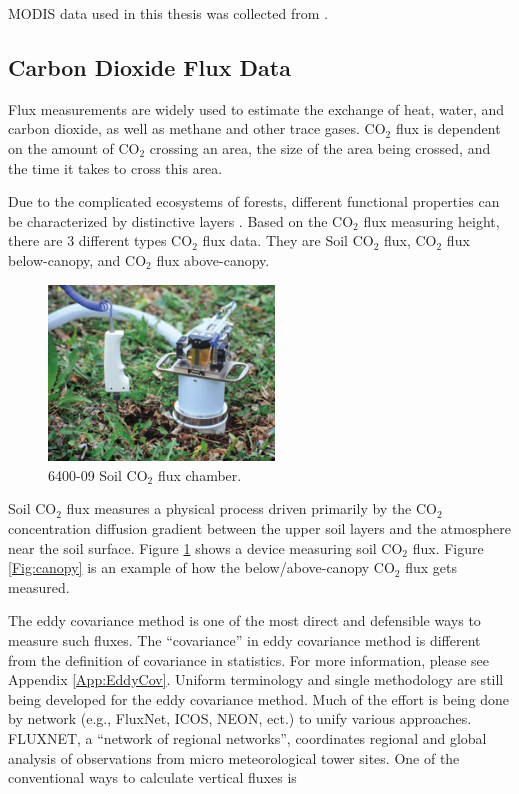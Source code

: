 \documentclass{article}\usepackage[]{graphicx}\usepackage[]{color}
\newcommand{\MYhref}[3][blue]{\href{#2}{\color{#1}{#3}}}%
\begin{document}
MODIS data used in this thesis was collected from \MYhref[black]{http://daac.ornl.gov/MODIS/}{the Oak Ridge National Laboratory Distributed Active Archive Center (ORNL DAAC) MODIS land product subsets}.

\subsection{Carbon Dioxide Flux Data}\label{SubSec:FluxData}

Flux measurements are widely used to estimate the exchange of heat, water, and carbon dioxide, as well as methane and other trace gases. CO$_2$ flux is dependent on the amount of CO$_2$ crossing an area, the size of the area being crossed, and the time it takes to cross this area.

Due to the complicated ecosystems of forests, different functional properties can be characterized by distinctive layers \citep{misson2007partitioning}.
Based on the CO$_2$ flux measuring height, there are 3 different types CO$_2$ flux data. They are Soil CO$_2$ flux, CO$_2$ flux below-canopy, and CO$_2$ flux above-canopy.

\begin{figure}[!ht]
\centering
\includegraphics[width=6cm]{soilflux.png}
\caption{6400-09 Soil CO$_2$ flux chamber.}
\label{Fig:soilflux}
\end{figure}

Soil CO$_2$ flux measures a physical process driven primarily by the CO$_2$ concentration diffusion gradient between the upper soil layers and the atmosphere near the soil surface. Figure \ref{Fig:soilflux} shows a device measuring soil CO$_2$ flux. Figure \ref{Fig:canopy} is an example of how the below/above-canopy CO$_2$ flux gets measured.

The eddy covariance method is one of the most direct and defensible ways to measure such fluxes. The ``covariance'' in eddy covariance method is different from the definition of covariance in statistics. For more information, please see Appendix \ref{App:EddyCov}. Uniform terminology and single methodology are still being developed for the eddy covariance method.  Much of the effort is being done by network (e.g., FluxNet, ICOS, NEON, ect.)  to unify various approaches. FLUXNET, a ``network of regional networks'', coordinates regional and global analysis of observations from micro meteorological tower sites. One of the conventional ways to calculate vertical fluxes is
\end{document}
